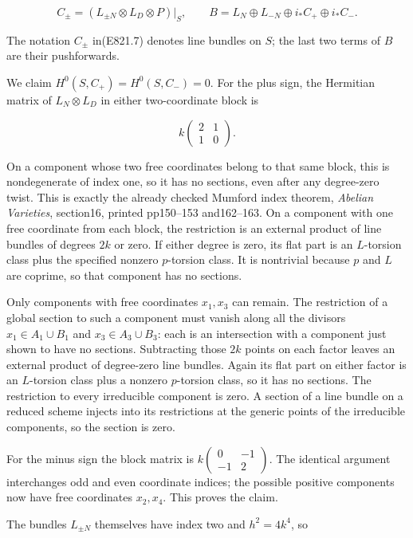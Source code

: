 \[
 C_\pm=(L_{\pm N}\otimes L_D\otimes P)|_S,
 \qquad
 B=L_N\oplus L_{-N}\oplus i_*C_+\oplus i_*C_-.
 \tag{E821.7}
\]

The notation \(C_\pm\) in(E821.7) denotes line bundles on \(S\); the
last two terms of \(B\) are their pushforwards.

We claim \(H^0(S,C_+)=H^0(S,C_-)=0\). For the plus sign, the Hermitian
matrix of \(L_N\otimes L_D\) in either two-coordinate block is

\[
 k\begin{pmatrix}2&1\\1&0\end{pmatrix}.
\]

On a component whose two free coordinates belong to that same block,
this is nondegenerate of index one, so it has no sections, even after
any degree-zero twist. This is exactly the already checked Mumford index
theorem, \emph{Abelian Varieties}, section16, printed pp150--153
and162--163. On a component with one free coordinate from each block,
the restriction is an external product of line bundles of degrees \(2k\)
or zero. If either degree is zero, its flat part is an \(L\)-torsion
class plus the specified nonzero \(p\)-torsion class. It is nontrivial
because \(p\) and \(L\) are coprime, so that component has no sections.

Only components with free coordinates \(x_1,x_3\) can remain. The
restriction of a global section to such a component must vanish along
all the divisors \(x_1\in A_1\cup B_1\) and \(x_3\in A_3\cup B_3\): each
is an intersection with a component just shown to have no sections.
Subtracting those \(2k\) points on each factor leaves an external
product of degree-zero line bundles. Again its flat part on either
factor is an \(L\)-torsion class plus a nonzero \(p\)-torsion class, so
it has no sections. The restriction to every irreducible component is
zero. A section of a line bundle on a reduced scheme injects into its
restrictions at the generic points of the irreducible components, so the
section is zero.

For the minus sign the block matrix is
\(k\left(\begin{smallmatrix}0&-1\\-1&2\end{smallmatrix}\right)\). The
identical argument interchanges odd and even coordinate indices; the
possible positive components now have free coordinates \(x_2,x_4\). This
proves the claim.

The bundles \(L_{\pm N}\) themselves have index two and \(h^2=4k^4\), so

